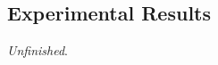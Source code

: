 \documentclass{llncs}
\begin{document}

\subsection{Experimental Results}

\emph{Unfinished}.






\end{document}
